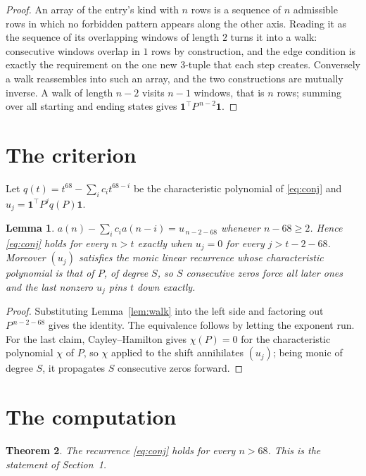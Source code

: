 \documentclass[11pt,a4paper]{article}
\theoremstyle{plain}
\newtheorem{theorem}{Theorem}
\newtheorem{lemma}[theorem]{Lemma}
\theoremstyle{definition}
\begin{document}
\begin{proof}
An array of the entry's kind with $n$ rows is a sequence of $n$ admissible rows in
which no forbidden pattern appears along the other axis. Reading it as the sequence of its
overlapping windows of length $2$ turns it into a walk: consecutive windows overlap in
$1$ rows by construction, and the edge condition is exactly the requirement on the one
new $3$-tuple that each step creates. Conversely a walk reassembles into such an array,
and the two constructions are mutually inverse. A walk of length $n-2$ visits $n-1$
windows, that is $n$ rows; summing over all starting and ending states gives
$\mathbf{1}^{\!\top}P^{\,n-2}\mathbf{1}$.
\end{proof}

\section{The criterion}

Let $q(t)=t^{68}-\sum_i c_i t^{68-i}$ be the characteristic polynomial of
\eqref{eq:conj} and $u_j=\mathbf{1}^{\!\top}P^{j}q(P)\mathbf{1}$.

\begin{lemma}\label{lem:crit}
$a(n)-\sum_i c_i a(n-i)=u_{\,n-2-68}$ whenever $n-68\ge2$. Hence
\eqref{eq:conj} holds for every $n>t$ exactly when $u_j=0$ for every
$j>t-2-68$. Moreover $(u_j)$ satisfies the monic linear recurrence whose
characteristic polynomial is that of $P$, of degree $S$, so $S$ consecutive zeros force all
later ones and the last nonzero $u_j$ pins $t$ down exactly.
\end{lemma}

\begin{proof}
Substituting Lemma~\ref{lem:walk} into the left side and factoring out
$P^{\,n-2-68}$ gives the identity. The equivalence follows by letting the exponent
run. For the last claim, Cayley--Hamilton gives $\chi(P)=0$ for the characteristic
polynomial $\chi$ of $P$, so $\chi$ applied to the shift annihilates $(u_j)$; being monic of
degree $S$, it propagates $S$ consecutive zeros forward.
\end{proof}

\section{The computation}

\begin{theorem}
The recurrence \eqref{eq:conj} holds for every $n>68$. This is the statement of
Section~1.
\end{theorem}
\end{document}
